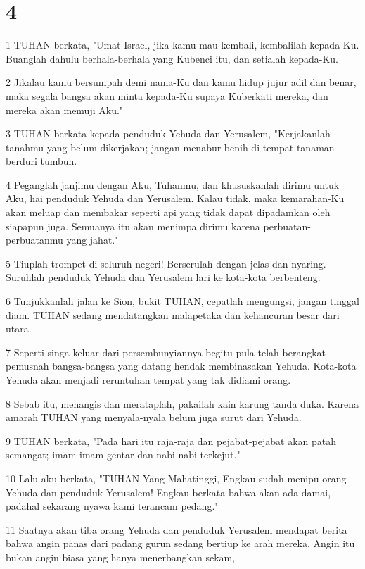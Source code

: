 \chapter{4}

\par 1 TUHAN berkata, "Umat Israel, jika kamu mau kembali, kembalilah kepada-Ku. Buanglah dahulu berhala-berhala yang Kubenci itu, dan setialah kepada-Ku.
\par 2 Jikalau kamu bersumpah demi nama-Ku dan kamu hidup jujur adil dan benar, maka segala bangsa akan minta kepada-Ku supaya Kuberkati mereka, dan mereka akan memuji Aku."
\par 3 TUHAN berkata kepada penduduk Yehuda dan Yerusalem, "Kerjakanlah tanahmu yang belum dikerjakan; jangan menabur benih di tempat tanaman berduri tumbuh.
\par 4 Peganglah janjimu dengan Aku, Tuhanmu, dan khususkanlah dirimu untuk Aku, hai penduduk Yehuda dan Yerusalem. Kalau tidak, maka kemarahan-Ku akan meluap dan membakar seperti api yang tidak dapat dipadamkan oleh siapapun juga. Semuanya itu akan menimpa dirimu karena perbuatan-perbuatanmu yang jahat."
\par 5 Tiuplah trompet di seluruh negeri! Berserulah dengan jelas dan nyaring. Suruhlah penduduk Yehuda dan Yerusalem lari ke kota-kota berbenteng.
\par 6 Tunjukkanlah jalan ke Sion, bukit TUHAN, cepatlah mengungsi, jangan tinggal diam. TUHAN sedang mendatangkan malapetaka dan kehancuran besar dari utara.
\par 7 Seperti singa keluar dari persembunyiannya begitu pula telah berangkat pemusnah bangsa-bangsa yang datang hendak membinasakan Yehuda. Kota-kota Yehuda akan menjadi reruntuhan tempat yang tak didiami orang.
\par 8 Sebab itu, menangis dan merataplah, pakailah kain karung tanda duka. Karena amarah TUHAN yang menyala-nyala belum juga surut dari Yehuda.
\par 9 TUHAN berkata, "Pada hari itu raja-raja dan pejabat-pejabat akan patah semangat; imam-imam gentar dan nabi-nabi terkejut."
\par 10 Lalu aku berkata, "TUHAN Yang Mahatinggi, Engkau sudah menipu orang Yehuda dan penduduk Yerusalem! Engkau berkata bahwa akan ada damai, padahal sekarang nyawa kami terancam pedang."
\par 11 Saatnya akan tiba orang Yehuda dan penduduk Yerusalem mendapat berita bahwa angin panas dari padang gurun sedang bertiup ke arah mereka. Angin itu bukan angin biasa yang hanya menerbangkan sekam,
